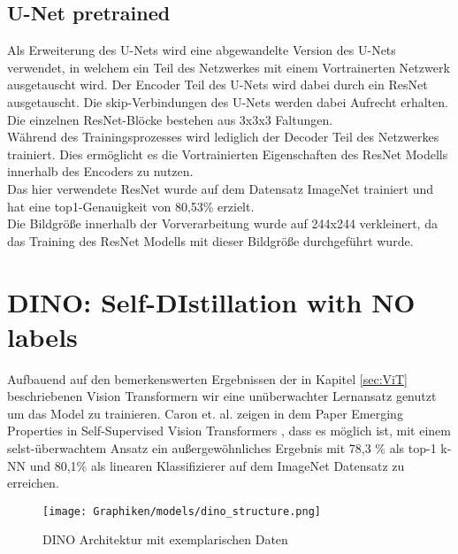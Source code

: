 	\subsection{U-Net pretrained}
		Als Erweiterung des U-Nets wird eine abgewandelte Version des U-Nets verwendet, in welchem ein Teil des Netzwerkes mit einem Vortrainerten Netzwerk ausgetauscht wird. Der Encoder Teil des U-Nets wird dabei durch ein ResNet \cite{resNet2015} ausgetauscht. Die skip-Verbindungen des U-Nets werden dabei Aufrecht erhalten. Die einzelnen ResNet-Blöcke bestehen aus 3x3x3 Faltungen. \\
		Während des Trainingsprozesses wird lediglich der Decoder Teil des Netzwerkes trainiert. Dies ermöglicht es die Vortrainierten Eigenschaften des ResNet Modells innerhalb des Encoders zu nutzen. \\
		Das hier verwendete ResNet wurde auf dem Datensatz ImageNet \cite{imagenetdeng2009} trainiert und hat eine top1-Genauigkeit von 80,53\% erzielt. \\
		Die Bildgröße innerhalb der Vorverarbeitung wurde auf 244x244 verkleinert, da das Training des ResNet Modells mit dieser Bildgröße durchgeführt wurde. 
		
		
	
	\section{DINO: Self-DIstillation with NO labels}
	\label{ansatz:dino}
		
		
		Aufbauend auf den bemerkenswerten Ergebnissen der in Kapitel \ref{sec:ViT} beschriebenen Vision Transformern wir eine unüberwachter Lernansatz genutzt um das Model zu trainieren. Caron et. al. zeigen in dem Paper Emerging Properties in Self-Supervised Vision Transformers \cite{caron2021emerging}, dass es möglich ist, mit einem selst-überwachtem Ansatz ein außergewöhnliches Ergebnis mit 78,3 \% als top-1 k-NN und 80,1\% als linearen Klassifizierer auf dem ImageNet\cite{imagenetdeng2009} Datensatz zu erreichen. \\
		
		
		\begin{figure}[h]
			\centering
			\texttt{[image: Graphiken/models/dino\_structure.png]}
			\caption{DINO Architektur mit exemplarischen Daten}
			\label{fig:dino_arch}
		\end{figure}
		
